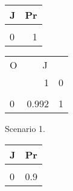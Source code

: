 \documentclass[10pt,]{scrartcl}
\begin{document}
\begin{figure}
 \hfill
\begin{subfigure}[!ht]{0.6\textwidth}
\begin{table}[H]
\centering
\begin{tabular}{lr}
\toprule
J & Pr\\
\midrule
\cellcolor{gray!6}{1} & \cellcolor{gray!6}{0}\\
0 & 1\\
\bottomrule
\end{tabular}
\end{table}

\begin{table}[H]
\centering
\begin{tabular}{lrr}
\toprule
\multicolumn{1}{c}{O} & \multicolumn{2}{c}{J} \\
  & 1 & 0\\
\midrule
\cellcolor{gray!6}{1} & \cellcolor{gray!6}{0.008} & \cellcolor{gray!6}{0}\\
0 & 0.992 & 1\\
\bottomrule
\end{tabular}
\end{table}
\caption{Scenario 1.}
\end{subfigure} 
\begin{subfigure}[!ht]{0.4\textwidth}
\begin{table}[H]
\centering
\begin{tabular}{lr}
\toprule
J & Pr\\
\midrule
\cellcolor{gray!6}{1} & \cellcolor{gray!6}{0.1}\\
0 & 0.9\\
\bottomrule
\end{tabular}
\end{table}


\end{subfigure}
\end{figure}
\end{document}
